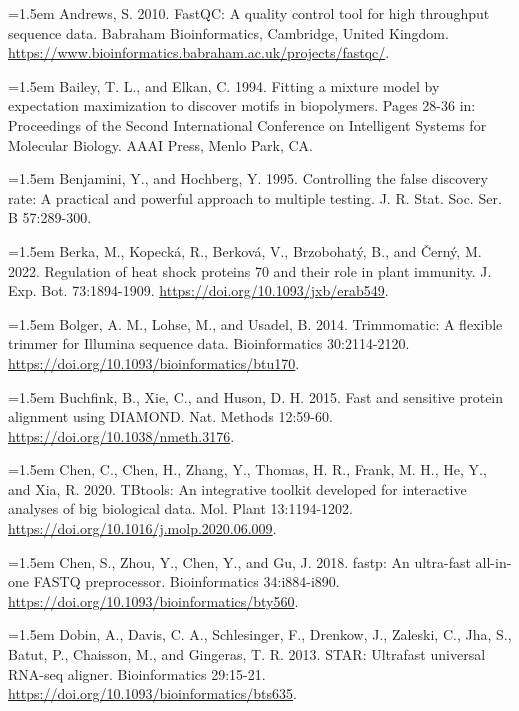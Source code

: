 \documentclass[12pt,letterpaper]{article}
\begin{document}
\noindent\hangindent=1.5em Andrews, S. 2010. FastQC: A quality control tool for high throughput sequence data. Babraham Bioinformatics, Cambridge, United Kingdom. \url{https://www.bioinformatics.babraham.ac.uk/projects/fastqc/}.\par

\noindent\hangindent=1.5em Bailey, T. L., and Elkan, C. 1994. Fitting a mixture model by expectation maximization to discover motifs in biopolymers. Pages 28-36 in: Proceedings of the Second International Conference on Intelligent Systems for Molecular Biology. AAAI Press, Menlo Park, CA.\par

\noindent\hangindent=1.5em Benjamini, Y., and Hochberg, Y. 1995. Controlling the false discovery rate: A practical and powerful approach to multiple testing. J. R. Stat. Soc. Ser. B 57:289-300.\par

\noindent\hangindent=1.5em Berka, M., Kopecká, R., Berková, V., Brzobohatý, B., and Černý, M. 2022. Regulation of heat shock proteins 70 and their role in plant immunity. J. Exp. Bot. 73:1894-1909. \url{https://doi.org/10.1093/jxb/erab549}.\par

\noindent\hangindent=1.5em Bolger, A. M., Lohse, M., and Usadel, B. 2014. Trimmomatic: A flexible trimmer for Illumina sequence data. Bioinformatics 30:2114-2120. \url{https://doi.org/10.1093/bioinformatics/btu170}.\par

\noindent\hangindent=1.5em Buchfink, B., Xie, C., and Huson, D. H. 2015. Fast and sensitive protein alignment using DIAMOND. Nat. Methods 12:59-60. \url{https://doi.org/10.1038/nmeth.3176}.\par

\noindent\hangindent=1.5em Chen, C., Chen, H., Zhang, Y., Thomas, H. R., Frank, M. H., He, Y., and Xia, R. 2020. TBtools: An integrative toolkit developed for interactive analyses of big biological data. Mol. Plant 13:1194-1202. \url{https://doi.org/10.1016/j.molp.2020.06.009}.\par

\noindent\hangindent=1.5em Chen, S., Zhou, Y., Chen, Y., and Gu, J. 2018. fastp: An ultra-fast all-in-one FASTQ preprocessor. Bioinformatics 34:i884-i890. \url{https://doi.org/10.1093/bioinformatics/bty560}.\par

\noindent\hangindent=1.5em Dobin, A., Davis, C. A., Schlesinger, F., Drenkow, J., Zaleski, C., Jha, S., Batut, P., Chaisson, M., and Gingeras, T. R. 2013. STAR: Ultrafast universal RNA-seq aligner. Bioinformatics 29:15-21. \url{https://doi.org/10.1093/bioinformatics/bts635}.\par
\end{document}

